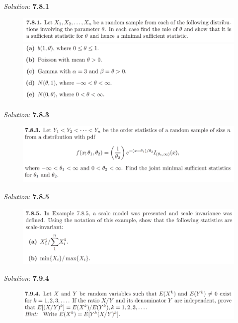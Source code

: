 \documentclass{book}
\theoremstyle{definition}
\begin{document}
\noindent\textit{Solution}:
\newpage
\noindent\textbf{7.8.1}
\begin{figure}[!htb]
	\centering
	\includegraphics[scale=0.5]{781a}
	\includegraphics[scale=0.5]{781b}
\end{figure}


\noindent\textit{Solution}:
\newpage
\noindent\textbf{7.8.3}
\begin{figure}[!htb]
	\centering
	\includegraphics[scale=0.5]{783}
\end{figure}


\noindent\textit{Solution}:
\newpage
\noindent\textbf{7.8.5}
\begin{figure}[!htb]
	\centering
	\includegraphics[scale=0.5]{785}
\end{figure}


\noindent\textit{Solution}:
\newpage
\noindent\textbf{7.9.4}
\begin{figure}[!htb]
	\centering
	\includegraphics[scale=0.5]{794}
\end{figure}
\end{document}
